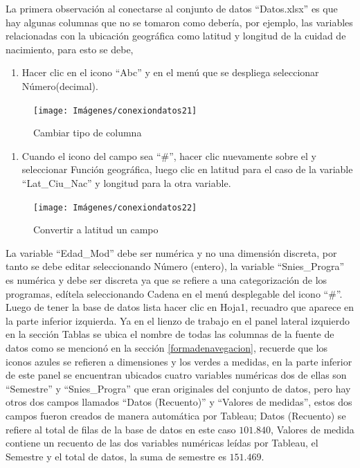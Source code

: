 \documentclass[
]{book}
\providecommand{\tightlist}{%
  \setlength{\itemsep}{0pt}\setlength{\parskip}{0pt}}
\begin{document}
La primera observación al conectarse al conjunto de datos ``Datos.xlsx'' es que hay algunas columnas que no se tomaron como debería, por ejemplo, las variables relacionadas con la ubicación geográfica como latitud y longitud de la cuidad de nacimiento, para esto se debe,

\begin{enumerate}
\def\labelenumi{\arabic{enumi}.}
\tightlist
\item
  Hacer clic en el icono ``Abc'' y en el menú que se despliega seleccionar Número(decimal).
\end{enumerate}

\begin{figure}

{\centering \texttt{[image: Imágenes/conexiondatos21]} 

}

\caption{Cambiar tipo de columna}\label{fig:geograficas-fig}
\end{figure}

\begin{enumerate}
\def\labelenumi{\arabic{enumi}.}
\setcounter{enumi}{1}
\tightlist
\item
  Cuando el icono del campo sea ``\#'', hacer clic nuevamente sobre el y seleccionar Función geográfica, luego clic en latitud para el caso de la variable ``Lat\_Ciu\_Nac'' y longitud para la otra variable.
\end{enumerate}

\begin{figure}

{\centering \texttt{[image: Imágenes/conexiondatos22]} 

}

\caption{Convertir a latitud un campo}\label{fig:geograficolatitud-fig}
\end{figure}

La variable ``Edad\_Mod'' debe ser numérica y no una dimensión discreta, por tanto se debe editar seleccionando Número (entero), la variable ``Snies\_Progra'' es numérica y debe ser discreta ya que se refiere a una categorización de los programas, edítela seleccionando Cadena en el menú desplegable del icono ``\#''. Luego de tener la base de datos lista hacer clic en Hoja1, recuadro que aparece en la parte inferior izquierda. Ya en el lienzo de trabajo en el panel lateral izquierdo en la sección Tablas se ubica el nombre de todas las columnas de la fuente de datos como se mencionó en la sección \ref{formadenavegacion}, recuerde que los iconos azules se refieren a dimensiones y los verdes a medidas, en la parte inferior de este panel se encuentran ubicados cuatro variables numéricas dos de ellas son ``Semestre'' y ``Snies\_Progra'' que eran originales del conjunto de datos, pero hay otros dos campos llamados ``Datos (Recuento)'' y ``Valores de medidas'', estos dos campos fueron creados de manera automática por Tableau; Datos (Recuento) se refiere al total de filas de la base de datos en este caso \(101.840\), Valores de medida contiene un recuento de las dos variables numéricas leídas por Tableau, el Semestre y el total de datos, la suma de semestre es \(151.469\).
\end{document}
